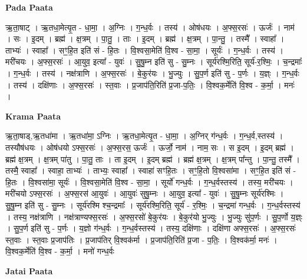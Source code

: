 \documentclass[17pt]{extarticle}
\begin{document}
\textbf{Pada Paata} \newline

ऋ॒ता॒षाट् । ऋ॒तधा॒मेत्यृ॒त - धा॒मा॒ । अ॒ग्निः । ग॒न्ध॒र्वः । तस्य॑ । ओष॑धयः । अ॒फ्स॒रसः॑ । ऊर्जः॑ । नाम॑ । सः । इ॒दम् । ब्रह्म॑ । क्ष॒त्रम् । पा॒तु॒ । ताः । इ॒दम् । ब्रह्म॑ । क्ष॒त्रम् । पा॒न्तु॒ । तस्मै᳚ । स्वाहा᳚ । ताभ्यः॑ । स्वाहा᳚ । सꣳ॒॒हि॒त इति॑ सं - हि॒तः । वि॒श्वसा॒मेति॑ वि॒श्व - सा॒मा॒ । सूर्यः॑ । ग॒न्ध॒र्वः । तस्य॑ । मरी॑चयः । अ॒फ्स॒रसः॑ । आ॒युव॒ इत्या᳚ - युवः॑ । सु॒षु॒म्न इति॑ सु - सु॒म्नः । सूर्य॑रश्मि॒रिति॒ सूर्य॑-र॒श्मिः॒ । च॒न्द्रमाः᳚ । ग॒न्ध॒र्वः । तस्य॑ । नक्ष॑त्राणि । अ॒फ्स॒रसः॑ । बे॒कुर॑यः । भु॒ज्युः । सु॒प॒र्ण इति॑ सु - प॒र्णः । य॒ज्ञ्ः । ग॒न्ध॒र्वः । तस्य॑ । दक्षि॑णाः । अ॒फ्स॒रसः॑ । स्त॒वाः । प्र॒जाप॑ति॒रिति॑ प्र॒जा-प॒तिः॒ । वि॒श्वक॒र्मेति॑ वि॒श्व - क॒र्मा॒ । मनः॑ ।  \newline


\textbf{Krama Paata} \newline

ऋ॒ता॒षाड्,ऋ॒तधा॑मा । ऋ॒तधा॑मा॒ ऽग्निः । ऋ॒तधा॒मेत्यृ॒त - धा॒मा॒ । अ॒ग्निर् ग॑न्ध॒र्वः । ग॒न्ध॒र्व,स्तस्य॑ । तस्यौष॑धयः । ओष॑धयो ऽफ्स॒रसः॑ । अ॒फ्स॒रस॒ ऊर्जः॑ । ऊर्जो॒ नाम॑ । नाम॒ सः । स इ॒दम् । इ॒दम् ब्रह्म॑ । ब्रह्म॑ क्ष॒त्रम् । क्ष॒त्रम् पा॑तु । पा॒तु॒ ताः । ता इ॒दम् । इ॒दम् ब्रह्म॑ । ब्रह्म॑ क्ष॒त्रम् । क्ष॒त्रम् पा᳚न्तु । पा॒न्तु॒ तस्मै᳚ । तस्मै॒ स्वाहा᳚ । स्वाहा॒ ताभ्यः॑ । ताभ्यः॒ स्वाहा᳚ । स्वाहा॑ सꣳहि॒तः । सꣳ॒॒हि॒तो वि॒श्वसा॑मा । सꣳ॒॒हि॒त इति॑ सं - हि॒तः । वि॒श्वसा॑मा॒ सूर्यः॑ । वि॒श्वसा॒मेति॑ वि॒श्व - सा॒मा॒ । सूर्यो॑ गन्ध॒र्वः । ग॒न्ध॒र्वस्तस्य॑ । तस्य॒ मरी॑चयः । मरी॑चयो ऽफ्स॒रसः॑ । अ॒फ्स॒रस॑ आ॒युवः॑ । आ॒युवः॑ सुषु॒म्नः । आ॒युव॒ इत्या᳚ - युवः॑ । सु॒षु॒म्नः 
सूर्य॑रश्मिः । सु॒षु॒म्न इति॑ सु - सु॒म्नः । सूर्य॑रश्मि श्च॒न्द्रमाः᳚ । सूर्य॑रश्मि॒रिति॒ सूर्य॑ - र॒श्मिः॒ । च॒न्द्रमा॑ गन्ध॒र्वः । ग॒न्ध॒र्वस्तस्य॑ । तस्य॒ नक्ष॑त्राणि । नक्ष॑त्राण्यफ्स॒रसः॑ । अ॒फ्स॒रसो॑ बे॒कुर॑यः । बे॒कुर॑यो भु॒ज्युः । भु॒ज्युः सु॑प॒र्णः । सु॒प॒र्णो य॒ज्ञ्ः । सु॒प॒र्ण इति॑ सु - प॒र्णः । य॒ज्ञो ग॑न्ध॒र्वः । ग॒न्ध॒र्वस्तस्य॑ । तस्य॒ दक्षि॑णाः । दक्षि॑णा अफ्स॒रसः॑ । अ॒फ्स॒रसः॑ स्त॒वाः । स्त॒वाः प्र॒जाप॑तिः । प्र॒जाप॑तिर् वि॒श्वक॑र्मा । प्र॒जाप॑ति॒रिति॑ प्र॒जा - प॒तिः॒ । वि॒श्वक॑र्मा॒ मनः॑ । वि॒श्वक॒र्मेति॑ वि॒श्व - क॒र्मा॒ । मनो॑ गन्ध॒र्वः \newline

\textbf{Jatai Paata} \newline
\end{document}
